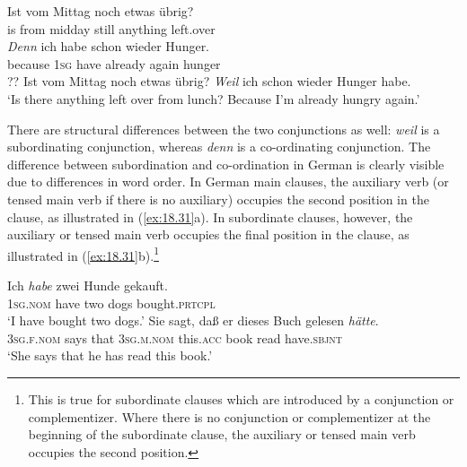 \ea \label{ex:18.30}
\ea  \gll Ist  vom  Mittag  noch  etwas  übrig?\\
is  from  midday  still  anything  left.over\\
\gll \textit{Denn}  ich  habe  schon  wieder  Hunger.\\
because  \textsc{1sg}  have  already  again  hunger\\
\ex ?? Ist vom Mittag noch etwas übrig? \textit{Weil} ich schon wieder Hunger habe.\\
\glt ‘Is there anything left over from lunch? Because I’m already hungry again.’
\z \z


There are structural differences between the two conjunctions as well: \textit{weil} is a subordinating conjunction, whereas \textit{denn} is a co-ordinating conjunction. The difference between subordination and co-ordination in German is clearly visible due to differences in word order. In German main clauses, the auxiliary verb (or tensed main verb if there is no auxiliary) occupies the second position in the clause, as illustrated in (\ref{ex:18.31}a). In subordinate clauses, however, the auxiliary or tensed main verb occupies the final position in the clause, as illustrated in (\ref{ex:18.31}b).\footnote{This is true for subordinate clauses which are introduced by a conjunction or complementizer. Where there is no conjunction or complementizer at the beginning of the subordinate clause, the auxiliary or tensed main verb occupies the second position.}


\ea \label{ex:18.31}
\ea   \gll Ich  \textit{habe}  zwei  Hunde  gekauft.\\
\textsc{1sg}.\textsc{nom}  have  two  dogs  bought.\textsc{prtcpl}\\
\glt ‘I have bought two dogs.’
\ex \gll Sie  sagt,  daß  er  dieses  Buch  gelesen  \textit{hätte}.\\
\textsc{3sg}.\textsc{f}.\textsc{nom}  says  that  \textsc{3sg}.\textsc{m}.\textsc{nom}  this.\textsc{acc}  book  read  have.\textsc{sbjnt}\\
\glt ‘She says that he has read this book.’
\z \z


